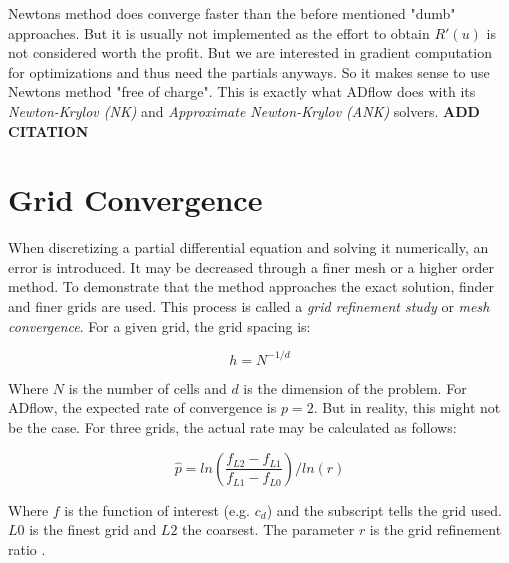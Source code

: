 \noindent Newtons method does converge faster than the before mentioned "dumb"
approaches. But it is usually not implemented as the effort to obtain $R'(u)$
is not considered worth the profit. But we are interested in gradient
computation for optimizations and thus need the partials anyways. So it makes
sense to use Newtons method "free of charge". This is exactly what ADflow does
with its \textit{Newton-Krylov (NK)} and \textit{Approximate Newton-Krylov
(ANK)} solvers. \textbf{ADD CITATION}








\section{Grid Convergence}
When discretizing a partial differential equation and solving it numerically,
an error is introduced. It may be decreased through a finer mesh or a higher
order method. To demonstrate that the method approaches the exact solution,
finder and finer grids are used. This process is called a \textit{grid
refinement study} or \textit{mesh convergence}. For a given grid, the grid
spacing is:

\begin{equation}
  h = N^{-1/d}
\end{equation}

\noindent Where $N$ is the number of cells and $d$ is the dimension of the
problem.
For ADflow, the expected rate of convergence is $p=2$. But in reality, this
might not be the case. For three grids, the actual rate may be calculated as
follows:

\begin{equation}
  \hat p = ln(\frac{f_{L2} - f_{L1}}{f_{L1} - f_{L0}}) / ln(r)
  \label{eq:conv_rate}
\end{equation}

\noindent Where $f$ is the function of interest (e.g. $c_{d}$) and the subscript
tells the grid used. $L0$ is the finest grid and $L2$ the coarsest. The
parameter $r$ is the grid refinement ratio .\cite{grid_refinement}
